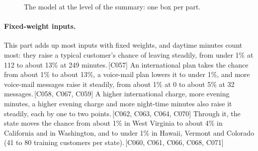 \documentclass[a4paper,10pt]{article}
\newif\ifreviewmarks
\newcommand{\reviewrule}{\noindent{\color{BrickRed}\rule{\linewidth}{0.8pt}}}
\newenvironment{drafted}[1][]{%
  \ifreviewmarks\par\addvspace{\medskipamount}\reviewrule\par\nopagebreak
  \noindent{\color{BrickRed}\sffamily\footnotesize\textbf{Thesis Draft}\quad #1\hfill review}\par\nopagebreak\smallskip\fi}{%
  \ifreviewmarks\par\smallskip\noindent{\color{BrickRed}\sffamily\footnotesize end of thesis draft}\par\nopagebreak\reviewrule\par\medskip\fi}
\begin{document}
\begin{drafted}[plain-language layer: churn100-s2-c1]
\begin{figure}[H]
{{}}%
\caption{The model at the level of the summary: one box per part.}
\label{fig:churn100s2c1:summary}
\end{figure}
\paragraph{Fixed-weight inputs.} This part adds up most inputs with fixed weights, and daytime minutes count most: they raise a typical customer's chance of leaving steadily, from under 1\% at 112 to about 13\% at 249 minutes.\,{\scriptsize\textcolor{NavyBlue}{[C057]}} An international plan takes the chance from about 1\% to about 13\%, a voice-mail plan lowers it to under 1\%, and more voice-mail messages raise it steadily, from about 1\% at 0 to about 5\% at 32 messages.\,{\scriptsize\textcolor{NavyBlue}{[C058, C067, C059]}} A higher international charge, more evening minutes, a higher evening charge and more night-time minutes also raise it steadily, each by one to two points.\,{\scriptsize\textcolor{NavyBlue}{[C062, C063, C064, C070]}} Through it, the state moves the chance from about 1\% in West Virginia to about 4\% in California and in Washington, and to under 1\% in Hawaii, Vermont and Colorado (41 to 80 training customers per state).\,{\scriptsize\textcolor{NavyBlue}{[C060, C061, C066, C068, C071]}}

\end{drafted}
\end{document}
